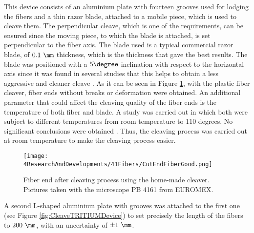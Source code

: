 This device consists of an aluminium plate with fourteen grooves used for lodging the fibers and a thin razor blade, attached to a mobile piece, which is used to cleave them. The perpendicular cleave, which is one of the requirements, can be ensured since the moving piece, to which the blade is attached, is set perpendicular to the fiber axis. The blade used is a typical commercial razor blade, of $0.1~\mm$ thickness, which is the thickness that gave the best results. The blade was positioned with a $5\degree$ inclination with respect to the horizontal axis since it was found in several studies that this helps to obtain a less aggressive and cleaner cleave \cite{AngleBlade, TemperatureBlade}. As it can be seen in Figure \ref{fig:CleavingFiberEnd}, with the plastic fiber cleaver, fiber ends without breaks or deformation were obtained. An additional parameter that could affect the cleaving quality of the fiber ends is the temperature of both fiber and blade. A study was carried out in which both were subject to different temperatures from room temperature to 110 degrees. No significant conclusions were obtained \cite{TFGAlberto}. Thus, the cleaving process was carried out at room temperature to make the cleaving process easier.

\begin{figure}[h]
\centering
\texttt{[image: 4ResearchAndDevelopments/41Fibers/CutEndFiberGood.png]}
\caption{Fiber end after cleaving process using the home-made cleaver. Pictures taken with the microscope PB 4161 from EUROMEX.\label{fig:CleavingFiberEnd}}
\end{figure}

A second L-shaped aluminium plate with grooves was attached to the first one (see Figure \ref{fig:CleaveTRITIUMDevice}) to set precisely the length of the fibers to $200~\mm$, with an uncertainty of $\pm 1~\mm$.